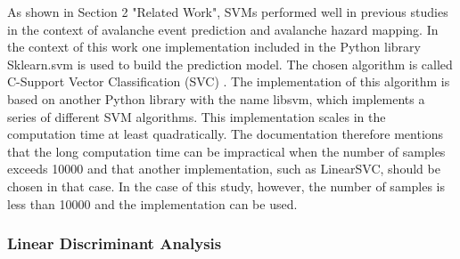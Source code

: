 \documentclass[../masterarbeit.tex]{subfiles}
\begin{document}
As shown in Section 2 "Related Work", SVMs performed well in previous studies in the context of avalanche event prediction and avalanche hazard mapping. \autocites[]{Tiwari:2021, THURING201560, Bahram:2019, Pozdnoukhov:2008}
In the context of this work one implementation included in the Python library Sklearn.svm is used to build the prediction model. The chosen algorithm is called C-Support Vector Classification (SVC) \textcite[]{Scikit-learn-svc:2022} . The implementation of this algorithm is based on another Python library with the name libsvm, which implements a series of different SVM algorithms. This implementation scales in the computation time at least quadratically. The documentation therefore mentions that the long computation time can be impractical when the number of samples exceeds 10000 and that another implementation, such as LinearSVC, should be chosen in that case. \autocite[]{Scikit-learn-svc:2022}
In the case of this study, however, the number of samples is less than 10000 and the implementation can be used.




\subsubsection{Linear Discriminant Analysis}
\end{document}
